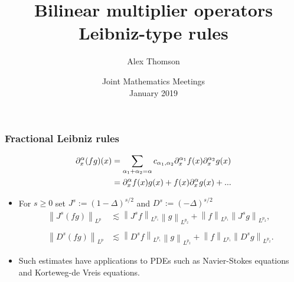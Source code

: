 \documentclass[xcolor=dvipsnames]{beamer}
\title[Leibniz-type rules]{Bilinear multiplier operators Leibniz-type rules}
\author[Alex Thomson]{Alex Thomson}
\institute[Kansas State University]{
Department of Mathematics \\
Kansas State University
 }
\date[January 2019]{Joint Mathematics Meetings\\ January 2019}
\newcommand{\na}{\mathbb{N}}
\newcommand{\fr}[2]{{\textstyle \frac{#1}{#2}}}
\newcommand{\norm}[2]{{\left\| #1 \right\|}_{#2}}
\newcommand{\hcline}{1/p=1/p_1+1/p_2}
\begin{document}
\begin{frame}[plain]
  \titlepage
\end{frame}


\begin{frame}\frametitle{Fractional Leibniz rules}
\begin{align*}
\partial^\alpha_x(fg)(x) & = \sum_{\alpha_1 + \alpha_2 = \alpha} c_{\alpha_1,\alpha_2} \partial^{\alpha_1}_x f(x) \partial^{\alpha_2}_x g(x)\\ \medskip
& =\partial^\alpha_x f(x) g(x) + f(x) \partial^\alpha_x g(x) + ...
\end{align*}

\begin{itemize}
\item  For $s \ge 0$ set $J^s:=(1-\Delta)^{s/2}$  and  $D^s:=(-\Delta)^{s/2}$
\begin{align*}
 \norm{J^s(fg)}{L^p} &\lesssim  \norm{J^sf}{L^{p_1}} \norm{g}{L^{p_2}}+ \norm{f}{L^{p_1}} \norm{J^sg}{L^{p_2}},\\
 &\\
   \norm{D^s(fg)}{L^p} &\lesssim  \norm{D^sf}{L^{p_1}} \norm{g}{L^{p_2}}+ \norm{f}{L^{p_1}} \norm{D^sg}{L^{p_2}}.
\end{align*}

\item Such estimates have applications to PDEs such as Navier-Stokes equations and Korteweg-de Vreis equations.
\end{itemize}

\end{frame}


%
\end{document}
